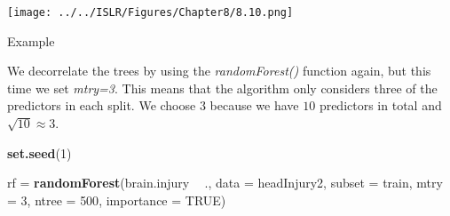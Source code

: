 \documentclass[10pt,ignorenonframetext,]{beamer}
\newenvironment{Shaded}{\begin{snugshade}}{\end{snugshade}}
\newcommand{\KeywordTok}[1]{\textcolor[rgb]{0.13,0.29,0.53}{\textbf{#1}}}
\newcommand{\DataTypeTok}[1]{\textcolor[rgb]{0.13,0.29,0.53}{#1}}
\newcommand{\DecValTok}[1]{\textcolor[rgb]{0.00,0.00,0.81}{#1}}
\newcommand{\StringTok}[1]{\textcolor[rgb]{0.31,0.60,0.02}{#1}}
\newcommand{\OtherTok}[1]{\textcolor[rgb]{0.56,0.35,0.01}{#1}}
\newcommand{\OperatorTok}[1]{\textcolor[rgb]{0.81,0.36,0.00}{\textbf{#1}}}
\newcommand{\NormalTok}[1]{#1}
\begin{document}
\begin{frame}

\texttt{[image: ../../ISLR/Figures/Chapter8/8.10.png]}

\end{frame}

\begin{frame}[fragile]

\begin{block}{Example}

We decorrelate the trees by using the \emph{randomForest()} function
again, but this time we set \emph{mtry=3}. This means that the algorithm
only considers three of the predictors in each split. We choose \(3\)
because we have \(10\) predictors in total and \(\sqrt{10}\approx 3\).

\begin{Shaded}
\begin{Highlighting}[]
\KeywordTok{set.seed}\NormalTok{(}\DecValTok{1}\NormalTok{)}

\NormalTok{rf =}\StringTok{ }\KeywordTok{randomForest}\NormalTok{(brain.injury }\OperatorTok{~}\StringTok{ }\NormalTok{., }\DataTypeTok{data =}\NormalTok{ headInjury2, }\DataTypeTok{subset =}\NormalTok{ train, }
    \DataTypeTok{mtry =} \DecValTok{3}\NormalTok{, }\DataTypeTok{ntree =} \DecValTok{500}\NormalTok{, }\DataTypeTok{importance =} \OtherTok{TRUE}\NormalTok{)}
\end{Highlighting}
\end{Shaded}

\end{block}

\end{frame}
\end{document}
